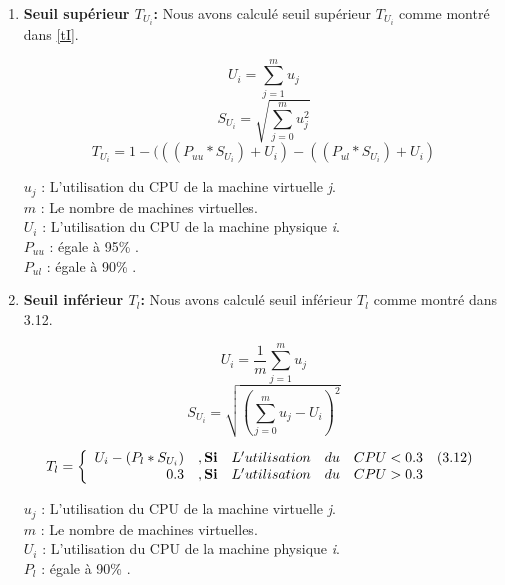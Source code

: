 \begin{onehalfspace}
\begin{enumerate}
\item \textbf{Seuil supérieur $T_{U_{i}}$:}
Nous avons calculé seuil supérieur $T_{U_{i}}$ comme montré dans \ref{tI}.
\begin{center}
\begin{equation}
U_{i} = \sum_{j=1}^{m} u_{j}
\end{equation}
\begin{equation}
S_{U_{i}} = \sqrt{\sum_{j=0}^{m} u_{j}^{2}}
\end{equation}
\begin{equation}
T_{U_{i}} = 1 - (((P_{uu} \ast S_{U_{i}}) + U_{i}) - ((P_{ul} \ast  S_{U_{i}}) + U_{i})
\label{tI}
\end{equation}
\end{center}
$u_{j}$ : L'utilisation du CPU de la machine virtuelle \textit{j}.\\
$m$ : Le nombre de machines virtuelles.\\
$U_{i}$ : L'utilisation du CPU de la machine physique \textit{i}.\\
$P_{uu}$ : égale à 95\% \cite{ref44}.\\
$P_{ul}$ : égale à 90\% \cite{ref44}.
\item \textbf{Seuil inférieur $T_{l}$:}
Nous avons calculé seuil inférieur $T_{l}$ comme montré dans 3.12.
\begin{center}
\begin{equation}
U_{i} = \frac{1}{m}\sum_{j=1}^{m} u_{j}
\end{equation}
\begin{equation}
S_{U_{i}} = \sqrt{(\sum_{j=0}^{m} u_{j} - U_{i})^{2}}
\end{equation}

\[
\label{TL}
T_{l} = \left\{
\begin{array}{r c l l l r}
U_{i} - (P_{l}*S_{U_{i}}) &,\textbf{Si}& L'utilisation& du& CPU < 0.3& (3.12)\\
0.3 &,\textbf{Si}& L'utilisation& du& CPU > 0.3
\end{array}
\right.
\]
\end{center}
$u_{j}$ : L'utilisation du CPU de la machine virtuelle \textit{j}.\\
$m$ : Le nombre de machines virtuelles.\\
$U_{i}$ : L'utilisation du CPU de la machine physique \textit{i}.\\
$P_{l}$ : égale à 90\% \cite{ref44}.
\end{enumerate}


\end{onehalfspace}
